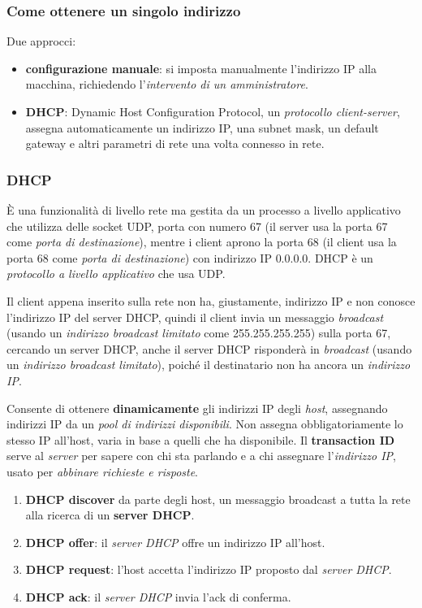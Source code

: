 \subsubsection{Come ottenere un singolo indirizzo}
Due approcci:
\begin{itemize}
  \item \textbf{configurazione manuale}: si imposta manualmente l'indirizzo IP alla macchina, richiedendo l'\textit{intervento di un amministratore}.
  \item \textbf{DHCP}: Dynamic Host Configuration Protocol, un \textit{protocollo client-server}, assegna automaticamente un indirizzo IP, una subnet mask, un default gateway e altri parametri di rete una volta connesso in rete.
\end{itemize}

\subsubsection{DHCP}
È una funzionalità di livello rete ma gestita da un processo a livello applicativo che utilizza delle socket UDP, porta con numero 67 (il server usa la porta 67 come \textit{porta di destinazione}), mentre i client aprono la porta 68 (il client usa la porta 68 come \textit{porta di destinazione}) con indirizzo IP $0.0.0.0$. DHCP è un \textit{protocollo a livello applicativo} che usa UDP.

Il client appena inserito sulla rete non ha, giustamente, indirizzo IP e non conosce l'indirizzo IP del server DHCP, quindi il client invia un messaggio \textit{broadcast} (usando un \textit{indirizzo broadcast limitato} come 255.255.255.255) sulla porta 67, cercando un server DHCP, anche il server DHCP risponderà in \textit{broadcast} (usando un \textit{indirizzo broadcast limitato}), poiché il destinatario non ha ancora un \textit{indirizzo IP}.

Consente di ottenere \textbf{dinamicamente} gli indirizzi IP degli \textit{host}, assegnando indirizzi IP da un \textit{pool di indirizzi disponibili}. Non assegna obbligatoriamente lo stesso IP all'host, varia in base a quelli che ha disponibile. Il \textbf{transaction ID} serve al \textit{server} per sapere con chi sta parlando e a chi assegnare l'\textit{indirizzo IP}, usato per \textit{abbinare richieste e risposte}.
\begin{enumerate}
  \item \textbf{DHCP discover} da parte degli host, un messaggio broadcast a tutta la rete alla ricerca di un \textbf{server DHCP}.
  \item \textbf{DHCP offer}: il \textit{server DHCP} offre un indirizzo IP all'host.
  \item \textbf{DHCP request}: l'host accetta l'indirizzo IP proposto dal \textit{server DHCP}.
  \item \textbf{DHCP ack}: il \textit{server DHCP} invia l'ack di conferma.
\end{enumerate}

